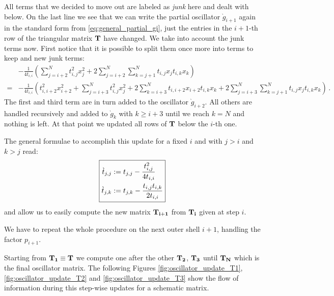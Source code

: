 \documentclass[a4paper,10pt]{article}
\begin{document}
All terms that we decided to move out are labeled as \emph{junk} here and dealt
with below.
On the last line we see that we can write the partial oscillator $\grave{g}_{i+1}$
again in the standard form from \eqref{eq:general_partial_gi}, just the
entries in the $i+1$-th row of the triangular matrix $\mathbf{T}$ have changed.
We take into account the junk terms now. First notice that it is possible
to split them once more into terms to keep and new junk terms:
\begin{equation*}
\begin{split}
  & - \frac{1}{4 t_{i,i}}
      \left(
        \sum_{j=i+2}^{N} t_{i,j}^2 x_j^2
        +
        2 \sum_{j=i+2}^{N} \sum_{k=j+1}^{N} t_{i,j} x_j t_{i,k} x_k
      \right) \\
  = & - \frac{1}{4 t_{i,i}}
      \left(
        t_{i,i+2}^2 x_{i+2}^2
        +
        \sum_{j=i+3}^{N} t_{i,j}^2 x_j^2
        +
        2 \sum_{k=i+3}^{N} t_{i,i+2} x_{i+2} t_{i,k} x_k
        +
        2 \sum_{j=i+3}^{N} \sum_{k=j+1}^{N} t_{i,j} x_j t_{i,k} x_k
      \right) \,.
\end{split}
\end{equation*}
The first and third term are in turn added to the oscillator $\grave{g}_{i+2}$.
All others are handled recursively and added to $\grave{g}_{k}$ with $k \geq i+3$
until we reach $k=N$ and nothing is left. At that point we updated all
rows of $\mathbf{T}$ below the $i$-th one.

The general formulae to accomplish this update for a fixed $i$ and
with $j > i$ and $k > j$ read:
\begin{equation} \label{eq:matrix_update_formulae}
\boxed{
\begin{aligned}
  \grave{t}_{j,j} & := t_{j,j} - \frac{t_{i,j}^2}{4 t_{i,i}} \\
  \grave{t}_{j,k} & := t_{j,k} - \frac{t_{i,j} t_{i,k}}{2 t_{i,i}}
\end{aligned}
}
\end{equation}
and allow us to easily compute the new matrix $\mathbf{T_{i+1}}$ from
$\mathbf{T_i}$ given at step $i$.

We have to repeat the whole procedure on the next outer shell $i+1$,
handling the factor $p_{i+1}$.

Starting from $\mathbf{T_1} \equiv \mathbf{T}$ we compute one after the other
$\mathbf{T_2}$, $\mathbf{T_3}$ until $\mathbf{T_N}$ which is the final oscillator
matrix. The following Figures \ref{fig:oscillator_update_T1}, \ref{fig:oscillator_update_T2}
and  \ref{fig:oscillator_update_T3} show the flow of information during this
step-wise updates for a schematic matrix.
\end{document}
